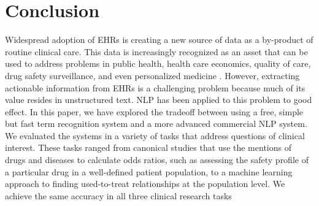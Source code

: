 \section{Conclusion}
Widespread adoption of EHRs is creating a new source of data as a
by-product of routine clinical care.  This data is increasingly
recognized as an asset that can be used to address problems in public
health, health care economics, quality of care, drug safety
surveillance, and even personalized medicine
\cite{Pathak2013,Pathak2013b,Denny2013,Jensen2012,Murdoch2013,Murff2011,Shah2013}.
However, extracting actionable information from EHRs is a challenging
problem because much of its value resides in unstructured text.  NLP
has been applied to this problem to good effect.  In this paper, we
have explored the tradeoff between using a free, simple but fast term
recognition system and a more advanced commercial NLP system.  We
evaluated the systems in a variety of tasks that address questions of
clinical interest.  These tasks ranged from canonical studies that use
the mentions of drugs and diseases to calculate odds ratios, such as
assessing the safety profile of a particular drug in a well-defined
patient population, to a machine learning approach to finding
used-to-treat relationships at the population level.  We achieve the
same accuracy in all three clinical research tasks
